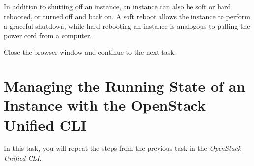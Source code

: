 \documentclass[letterpaper, 12pt]{article}
\begin{document}
\begin{enumerate}
    \begin{tipbox}
        In addition to shutting off an instance, an instance can also be soft or hard rebooted, or turned off and back on.
        A soft reboot allows the instance to perform a graceful shutdown, while hard rebooting an instance is analogous to pulling the power cord from a computer.
    \end{tipbox}

    \begin{labstep}
        Close the browser window and continue to the next task.
    \end{labstep}

\end{enumerate}

\section{Managing the Running State of an Instance with the OpenStack Unified CLI}\label{sec:managing_the_power_state_of_an_instance_cli}
In this task, you will repeat the steps from the previous task in the \textit{OpenStack Unified CLI}.
\end{document}
